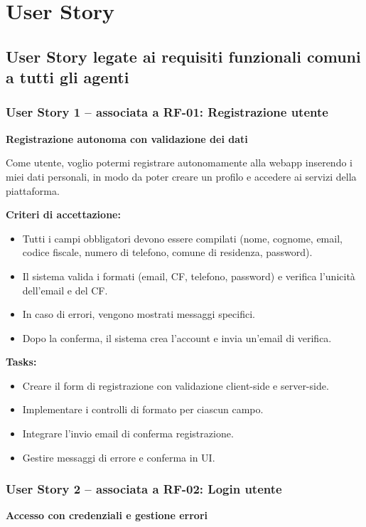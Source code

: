 \setcounter{section}{4}
\setlength{\parindent}{0pt}  %
\setlength{\parskip}{6pt}
\setlength{\itemsep}{3pt}
\section{User Story}
\subsection{User Story legate ai requisiti funzionali comuni a tutti gli agenti}
\subsubsection*{User Story 1 – associata a RF-01: Registrazione utente}
\textbf{Registrazione autonoma con validazione dei dati}

Come utente, voglio potermi registrare autonomamente alla webapp inserendo i miei dati personali, in modo da poter creare un profilo e accedere ai servizi della piattaforma.

\textbf{Criteri di accettazione:}
\begin{itemize}
    \item Tutti i campi obbligatori devono essere compilati (nome, cognome, email, codice fiscale, numero di telefono, comune di residenza, password).
    \item Il sistema valida i formati (email, CF, telefono, password) e verifica l'unicità dell'email e del CF.
    \item In caso di errori, vengono mostrati messaggi specifici.
    \item Dopo la conferma, il sistema crea l’account e invia un’email di verifica.
\end{itemize}
\textbf{Tasks:}
\begin{itemize}
    \item Creare il form di registrazione con validazione client-side e server-side.
    \item Implementare i controlli di formato per ciascun campo.
    \item Integrare l’invio email di conferma registrazione.
    \item Gestire messaggi di errore e conferma in UI.
\end{itemize}
\subsubsection*{User Story 2 – associata a RF-02: Login utente}
\textbf{Accesso con credenziali e gestione errori}

